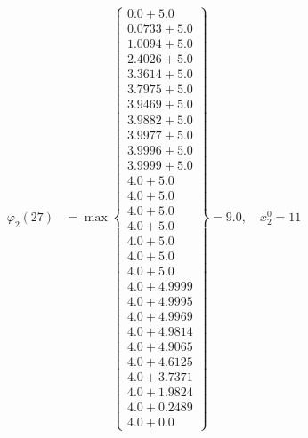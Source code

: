 \documentclass{article}
\begin{document}
\begin{align*}
\varphi_{2}(27) &= \max \left\{ \begin{array}{c}
0.0 + 5.0 \\
 0.0733 + 5.0 \\
 1.0094 + 5.0 \\
 2.4026 + 5.0 \\
 3.3614 + 5.0 \\
 3.7975 + 5.0 \\
 3.9469 + 5.0 \\
 3.9882 + 5.0 \\
 3.9977 + 5.0 \\
 3.9996 + 5.0 \\
 3.9999 + 5.0 \\
 4.0 + 5.0 \\
 4.0 + 5.0 \\
 4.0 + 5.0 \\
 4.0 + 5.0 \\
 4.0 + 5.0 \\
 4.0 + 5.0 \\
 4.0 + 5.0 \\
 4.0 + 4.9999 \\
 4.0 + 4.9995 \\
 4.0 + 4.9969 \\
 4.0 + 4.9814 \\
 4.0 + 4.9065 \\
 4.0 + 4.6125 \\
 4.0 + 3.7371 \\
 4.0 + 1.9824 \\
 4.0 + 0.2489 \\
 4.0 + 0.0
\end{array} \right\}=9.0, \quad x_{2}^0=11\\
  

\end{align*}
\end{document}
